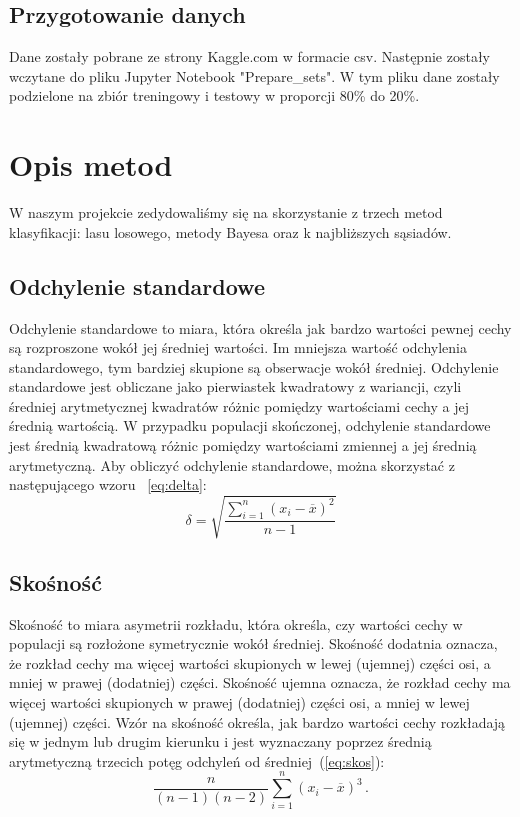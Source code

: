 \documentclass{article}
\begin{document}
\subsection{Przygotowanie danych}
Dane zostały pobrane ze strony Kaggle.com w formacie csv. Następnie zostały wczytane do pliku Jupyter Notebook "Prepare\_sets". W tym pliku dane zostały podzielone na zbiór treningowy i testowy w proporcji 80\% do 20\%.

\section{Opis metod}
W naszym projekcie zedydowaliśmy się na skorzystanie z trzech metod klasyfikacji: lasu losowego, metody Bayesa oraz k najbliższych sąsiadów.
\subsection{Odchylenie standardowe}
Odchylenie standardowe  to miara, która określa jak bardzo wartości pewnej cechy są rozproszone wokół jej średniej wartości. Im mniejsza wartość odchylenia standardowego, tym bardziej skupione są obserwacje wokół średniej. Odchylenie standardowe jest obliczane jako pierwiastek kwadratowy z wariancji, czyli średniej arytmetycznej kwadratów różnic pomiędzy wartościami cechy a jej średnią wartością. W przypadku populacji skończonej, odchylenie standardowe jest średnią kwadratową różnic pomiędzy wartościami zmiennej a jej średnią arytmetyczną. Aby obliczyć odchylenie standardowe, można skorzystać z następującego wzoru ~\ref{eq:delta}:
\begin{equation}
    \delta = \sqrt{\frac{\sum_{i=1}^n(x_i-\overline{x})^2}{n-1}}
    \label{eq:delta}
\end{equation}
\subsection{Skośność}
Skośność  to miara asymetrii rozkładu, która określa, czy wartości cechy w populacji są rozłożone symetrycznie wokół średniej. Skośność dodatnia oznacza, że rozkład cechy ma więcej wartości skupionych w lewej (ujemnej) części osi, a mniej w prawej (dodatniej) części. Skośność ujemna oznacza, że rozkład cechy ma więcej wartości skupionych w prawej (dodatniej) części osi, a mniej w lewej (ujemnej) części. Wzór na skośność określa, jak bardzo wartości cechy rozkładają się w jednym lub drugim kierunku i jest wyznaczany poprzez średnią arytmetyczną trzecich potęg odchyleń od średniej~(\ref{eq:skos}):
\begin{equation}
    \frac{n}{(n-1)(n-2)}\sum_{i=1}^{n}(x_i-\overline{x})^3 \, .
    \label{eq:skos}
\end{equation}
\end{document}
